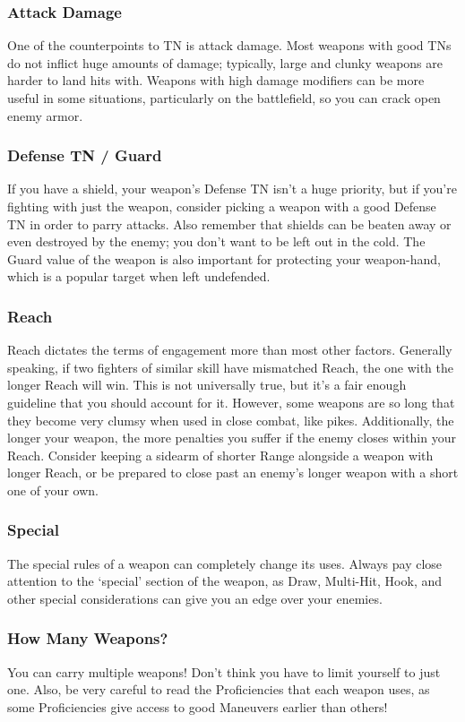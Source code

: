 \documentclass[oneside,11pt,english]{book}
\begin{document}
\subsubsection{Attack Damage}
One of the counterpoints to TN is attack damage. Most weapons with good TNs do
not inflict huge amounts of damage; typically, large and clunky weapons are
harder to land hits with. Weapons with high damage modifiers can be more useful
in some situations, particularly on the battlefield, so you can crack open enemy
armor.
\subsubsection{Defense TN / Guard}
If you have a shield, your weapon’s Defense TN isn’t a huge priority, but if
you’re fighting with just the weapon, consider picking a weapon with a good
Defense TN in order to parry attacks. Also remember that shields can be beaten
away or even destroyed by the enemy; you don’t want to be left out in the cold.
The Guard value of the weapon is also important for protecting your weapon-hand,
which is a popular target when left undefended.
\subsubsection{Reach}
Reach dictates the terms of engagement more than most other factors. Generally
speaking, if two fighters of similar skill have mismatched Reach, the one with
the longer Reach will win. This is not universally true, but it’s a fair enough
guideline that you should account for it. However, some weapons are so long that
they become very clumsy when used in close combat, like pikes. Additionally, the
longer your weapon, the more penalties you suffer if the enemy closes within
your Reach. Consider keeping a sidearm of shorter Range alongside a weapon with
longer Reach, or be prepared to close past an enemy’s longer weapon with a short
one of your own.
\subsubsection{Special}
The special rules of a weapon can completely change its uses. Always pay close
attention to the ‘special’ section of the weapon, as Draw, Multi-Hit, Hook, and
other special considerations can give you an edge over your enemies.

\subsubsection{How Many Weapons?}
You can carry multiple weapons! Don’t think you have to limit yourself to just
one. Also, be very careful to read the Proficiencies that each weapon uses, as
some Proficiencies give access to good Maneuvers earlier than others!
\end{document}
